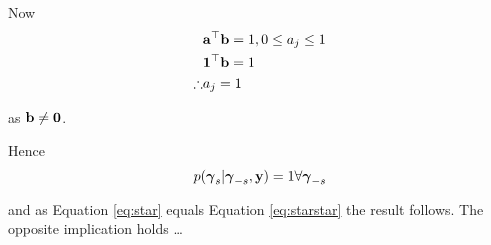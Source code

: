 \documentclass{amsart}[12pt]
\begin{document}
Now
\begin{align*}
	           & {\bf a}^\top {\bf b} = 1, 0 \leq a_j \leq 1 \\
	           & {\bf 1}^\top {\bf b} = 1                  \\
	\therefore & a_j = 1                             \\
\end{align*}

as ${\bf b} \ne {\bf0}$.

Hence
\begin{equation}\label{eq:starstar}
	p({\boldsymbol \gamma}_s|{\boldsymbol \gamma}_{-s}, {\bf y}) = 1 \forall {\boldsymbol\gamma}_{-s}
\end{equation}

and as Equation \ref{eq:star} equals Equation \ref{eq:starstar} the result follows. The opposite implication
holds \ldots



\end{document}
